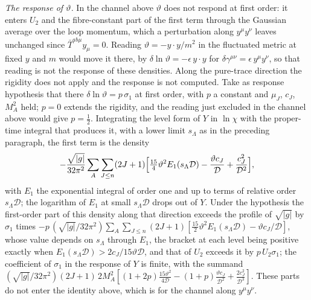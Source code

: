 \emph{The response of \(\vartheta\).} In the channel above \(\vartheta\) does not respond at first order: it enters \(U_2\) and the fibre-constant part of the first term through the Gaussian average over the loop momentum, which a perturbation along \(y^\mu y^\nu\) leaves unchanged since \(\bar T^{ab\mu}y_\mu=0\). Reading \(\vartheta=-y\cdot y/m^2\) in the fluctuated metric at fixed \(y\) and \(m\) would move it there, by \(\delta\ln\vartheta=-\epsilon\,y\cdot y\) for \(\delta\gamma^{\mu\nu}=\epsilon\,y^\mu y^\nu\), so that reading is not the response of these densities. Along the pure-trace direction the rigidity does not apply and the response is not computed. Take as response hypothesis that there \(\delta\ln\vartheta=p\,\sigma_1\) at first order, with \(p\) a constant and \(\mu_J\), \(c_J\), \(M_A^2\) held; \(p=0\) extends the rigidity, and the reading just excluded in the channel above would give \(p=\tfrac12\). Integrating the level form of \(Y\) in \(\ln\chi\) with the proper-time integral that produces it, with a lower limit \(s_\Lambda\) as in the preceding paragraph, the first term is the density
\[
-\frac{\sqrt{|g|}}{32\pi^2}\sum_A\sum_{J\le n}(2J+1)\Bigl[\tfrac{15}{4}\vartheta^2E_1(s_\Lambda\mathcal D)-\frac{\vartheta c_J}{\mathcal D}+\frac{c_J^2}{\mathcal D^2}\Bigr],
\]
with \(E_1\) the exponential integral of order one and up to terms of relative order \(s_\Lambda\mathcal D\); the logarithm of \(E_1\) at small \(s_\Lambda\mathcal D\) drops out of \(Y\). Under the hypothesis the first-order part of this density along that direction exceeds the profile of \(\sqrt{|g|}\) by \(\sigma_1\) times \(-p\,(\sqrt{|g|}/32\pi^2)\sum_A\sum_{J\le n}(2J+1)[\tfrac{15}{2}\vartheta^2E_1(s_\Lambda\mathcal D)-\vartheta c_J/\mathcal D]\), whose value depends on \(s_\Lambda\) through \(E_1\), the bracket at each level being positive exactly when \(E_1(s_\Lambda\mathcal D)>2c_J/15\vartheta\mathcal D\), and that of \(U_2\) exceeds it by \(p\,U_2\sigma_1\); the coefficient of \(\sigma_1\) in the response of \(Y\) is finite, with the summand \((\sqrt{|g|}/32\pi^2)(2J+1)\,2M_A^2[(1+2p)\tfrac{15\vartheta^2}{4\mathcal D}-(1+p)\tfrac{\vartheta c_J}{\mathcal D^2}+\tfrac{2c_J^2}{\mathcal D^3}]\). These parts do not enter the identity above, which is for the channel along \(y^\mu y^\nu\).

